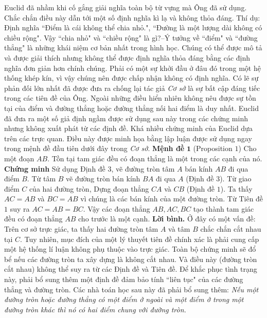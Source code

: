 \begin{multicols}{2}
	Euclid đã nhầm khi cố gắng giải nghĩa toàn bộ từ vựng mà Ông đã sử dụng. Chắc chắn điều này dẫn tới một số định nghĩa kì lạ và không thỏa đáng. Thí dụ: Định nghĩa ``Điểm là cái không thể chia nhỏ.", ``Đường là một lượng dài không có chiều rộng". Vậy ``chia nhỏ" và ``chiều rộng" là gì?--Ý tưởng về ``điểm" và ``đường thẳng" là những khái niệm cơ bản nhất trong hình học. Chúng có thể được mô tả và được giải thích nhưng không thể được định nghĩa thỏa đáng bằng các định nghĩa đơn giản hơn chính chúng. Phải có một sự khởi đầu ở đâu đó trong một hệ thống khép kín, vì vậy chúng nên được chấp nhận không có định nghĩa.
	\vskip 0.1cm
	Có lẽ sự phản đối lớn nhất đã được đưa ra chống lại tác giả \textit{Cơ sở} là sự bất cập đáng tiếc trong các tiên đề của Ông. Ngoài những điều hiển nhiên không nêu được sự tồn tại của điểm và đường thẳng hoặc đường thẳng nối hai điểm là duy nhất. Euclid đã đưa ra một số giả định ngầm được sử dụng sau này trong các chứng minh nhưng không xuất phát từ các định đề. Khá nhiều chứng minh của Euclid dựa trên các trực quan. Điều này được minh họa bằng lập luận được sử dụng ngay trong mệnh đề đầu tiên dưới đây trong \textit{Cơ sở}.
	\vskip 0.1cm 
	\textbf{\color{lichsutoanhoc}Mệnh đề} $\pmb{1}$ (Proposition $1$) Cho một đoạn $AB$. Tồn tại tam giác đều có đoạn thẳng là một trong các cạnh của nó.
	\vskip 0.1cm
	\textbf{\color{lichsutoanhoc}Chứng minh} Sử dụng Định đề $3$, vẽ đường tròn tâm $A$ bán kính $AB$ đi qua điểm $B$. Từ tâm $B$ vẽ đường tròn bán kính $BA$ đi qua $A$ (Định đề $3$). Từ giao điểm $C$ của hai đường tròn, Dựng đoạn thẳng $CA$ và $CB$ (Định đề $1$).  Ta thấy $AC=AB$ và $BC=AB$ vì chúng là các bán kính của một đường tròn. Từ Tiên đề $1$ suy ra $AC=AB=BC$. Vậy các đoạn thẳng $AB, AC, BC$ tạo thành tam giác đều có đoạn thẳng $AB$ cho trước là một cạnh.
	\vskip 0.1cm
	\textbf{\color{lichsutoanhoc}Lời bình.} Ở đây có một vấn đề: Trên cơ sở trực giác, ta thấy hai đường tròn tâm $A$ và tâm $B$ chắc chắn cắt nhau tại $C$.  Tuy nhiên, mục đích của một lý thuyết tiên đề chính xác là phải cung cấp một hệ thống lí luận không phụ thuộc vào trực giác. Toàn bộ chứng minh sẽ đổ bể nếu các đường tròn ta xây dựng là không cắt nhau. Và điều này (đường tròn cắt nhau) không thể suy ra từ các Định đề và Tiên đề. Để khắc phục tình trạng này, phải bổ sung thêm một định đề đảm bảo tính ``liên tục" của các đường thẳng và đường tròn. Các nhà toán học sau này đã phải bổ sung thêm:
	\vskip 0.1cm
	\textit{Nếu một đường tròn hoặc đường thẳng có một điểm ở ngoài và một điểm ở trong một đường tròn khác thì nó có hai điểm chung với đường tròn.}
	\vskip 0.1cm 

\end{multicols}
